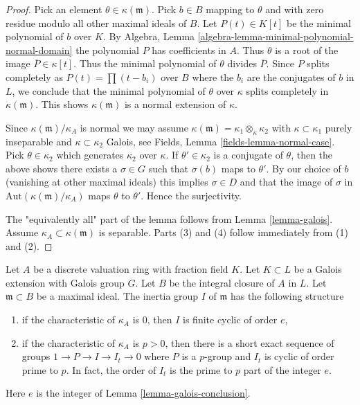 \begin{proof}
Pick an element $\theta \in \kappa(\mathfrak m)$. Pick $b \in B$ mapping to
$\theta$ and with zero residue modulo all other maximal ideals of $B$. Let
$P(t) \in K[t]$ be the minimal polynomial of $b$ over $K$. By
Algebra, Lemma \ref{algebra-lemma-minimal-polynomial-normal-domain}
the polynomial $P$ has coefficients in $A$.
Thus $\theta$ is a root of the image $\overline{P} \in \kappa[t]$.
Thus the minimal polynomial of $\theta$ divides $\overline{P}$.
Since $P$ splits completely as $P(t) = \prod (t - b_i)$ over $B$ where
the $b_i$ are the conjugates of $b$ in $L$, we conclude that
the minimal polynomial of $\theta$ over $\kappa$ splits completely in
$\kappa(\mathfrak m)$. This shows $\kappa(\mathfrak m)$ is a normal extension
of $\kappa$.

\medskip\noindent
Since $\kappa(\mathfrak m)/\kappa_A$ is normal we may assume
$\kappa(\mathfrak m) = \kappa_1 \otimes_\kappa \kappa_2$ with
$\kappa \subset \kappa_1$ purely inseparable and $\kappa \subset \kappa_2$
Galois, see
Fields, Lemma \ref{fields-lemma-normal-case}. Pick $\theta \in \kappa_2$
which generates $\kappa_2$ over $\kappa$. If $\theta' \in \kappa_2$
is a conjugate of $\theta$, then the above shows there exists a
$\sigma \in G$ such that $\sigma(b)$ maps to $\theta'$. By our choice of
$b$ (vanishing at other maximal ideals) this implies $\sigma \in D$ and
that the image of $\sigma$ in $\text{Aut}(\kappa(\mathfrak m)/\kappa_A)$
maps $\theta$ to $\theta'$. Hence the surjectivity.

\medskip\noindent
The "equivalently all" part of the lemma follows from
Lemma \ref{lemma-galois}. Assume $\kappa_A \subset \kappa(\mathfrak m)$
is separable. Parts (3) and (4) follow immediately from (1) and (2).
\end{proof}

\begin{lemma}
\label{lemma-galois-inertia}
Let $A$ be a discrete valuation ring with fraction field $K$.
Let $K \subset L$ be a Galois extension with Galois group $G$.
Let $B$ be the integral closure of $A$ in $L$. Let $\mathfrak m \subset B$
be a maximal ideal. The inertia group $I$ of $\mathfrak m$ has the
following structure
\begin{enumerate}
\item if the characteristic of $\kappa_A$ is $0$, then $I$ is
finite cyclic of order $e$,
\item if the characteristic of $\kappa_A$ is $p > 0$, then there is a short
exact sequence of groups $1 \to P \to I \to I_t \to 0$ where $P$ is a
$p$-group and $I_t$ is cyclic of order prime to $p$. In fact, the order
of $I_t$ is the prime to $p$ part of the integer $e$.
\end{enumerate}
Here $e$ is the integer of Lemma \ref{lemma-galois-conclusion}.
\end{lemma}

